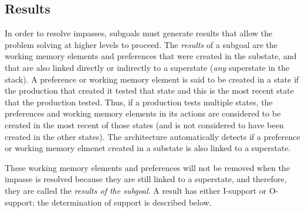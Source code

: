 \subsection{Results}
\label{ARCH-impasses-results}

In order to resolve impasses, subgoals must generate results that allow
the problem solving at higher levels to proceed.  The {\em results} of a
subgoal are the working memory elements and preferences that were
created in the substate, and that are also linked directly or indirectly
to a superstate (\emph{any} superstate in the stack). A preference or
working memory element is said to be created in a state if the
production that created it tested that state and this is the most recent
state that the production tested. Thus, if a production tests multiple
states, the preferences and working memory elements in its actions are
considered to be created in the most recent of those states (and is not
considered to have been created in the other states). The architecture
automatically detects if a preference or working memory elmenet created
in a substate is also linked to a superstate.

These working memory elements and preferences will not be removed when
the impasse is resolved because they are still linked to a superstate,
and therefore, they are called the \textit{results of the subgoal}.  A
result has either I-support or O-support; the determination of support is
described below.




